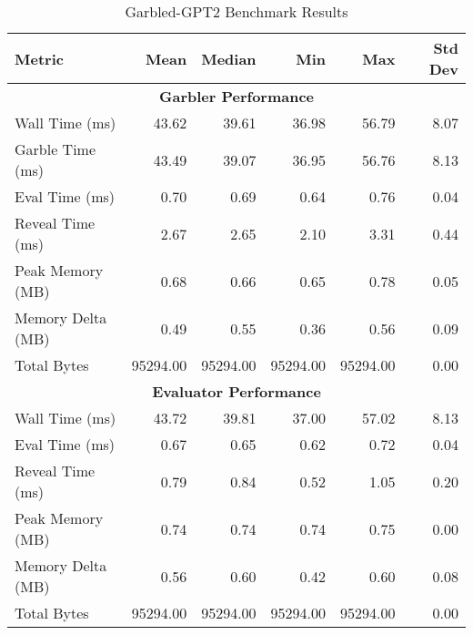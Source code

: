 \begin{table}[htbp]
\centering
\caption{Garbled-GPT2 Benchmark Results}
\label{tab:benchmark-results}
\begin{tabular}{|l|r|r|r|r|r|}
\hline
\textbf{Metric} & \textbf{Mean} & \textbf{Median} & \textbf{Min} & \textbf{Max} & \textbf{Std Dev} \\
\hline
\multicolumn{6}{|c|}{\textbf{Garbler Performance}} \\
\hline
Wall Time (ms) & 43.62 & 39.61 & 36.98 & 56.79 & 8.07 \\
Garble Time (ms) & 43.49 & 39.07 & 36.95 & 56.76 & 8.13 \\
Eval Time (ms) & 0.70 & 0.69 & 0.64 & 0.76 & 0.04 \\
Reveal Time (ms) & 2.67 & 2.65 & 2.10 & 3.31 & 0.44 \\
Peak Memory (MB) & 0.68 & 0.66 & 0.65 & 0.78 & 0.05 \\
Memory Delta (MB) & 0.49 & 0.55 & 0.36 & 0.56 & 0.09 \\
Total Bytes & 95294.00 & 95294.00 & 95294.00 & 95294.00 & 0.00 \\
\hline
\multicolumn{6}{|c|}{\textbf{Evaluator Performance}} \\
\hline
Wall Time (ms) & 43.72 & 39.81 & 37.00 & 57.02 & 8.13 \\
Eval Time (ms) & 0.67 & 0.65 & 0.62 & 0.72 & 0.04 \\
Reveal Time (ms) & 0.79 & 0.84 & 0.52 & 1.05 & 0.20 \\
Peak Memory (MB) & 0.74 & 0.74 & 0.74 & 0.75 & 0.00 \\
Memory Delta (MB) & 0.56 & 0.60 & 0.42 & 0.60 & 0.08 \\
Total Bytes & 95294.00 & 95294.00 & 95294.00 & 95294.00 & 0.00 \\
\hline
\end{tabular}
\end{table}